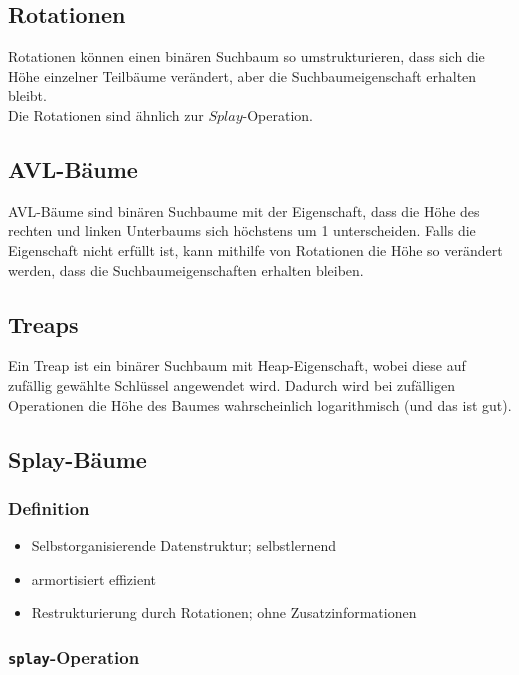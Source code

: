 \documentclass[11pt]{scrartcl}
\begin{document}
\subsection{Rotationen}
Rotationen können einen binären Suchbaum so umstrukturieren, dass sich die Höhe einzelner Teilbäume verändert, aber die Suchbaumeigenschaft erhalten bleibt. \\
Die Rotationen sind ähnlich zur $Splay$-Operation.

\subsection{AVL-Bäume}
AVL-Bäume sind binären Suchbaume mit der Eigenschaft, dass die Höhe des rechten und linken Unterbaums sich höchstens um 1 unterscheiden. Falls die Eigenschaft nicht erfüllt ist, kann mithilfe von Rotationen  die Höhe so verändert werden, dass die Suchbaumeigenschaften erhalten bleiben.

\subsection{Treaps}

Ein Treap ist ein binärer Suchbaum mit Heap-Eigenschaft, wobei diese auf zufällig gewählte Schlüssel angewendet wird. Dadurch wird bei zufälligen Operationen die Höhe des Baumes wahrscheinlich logarithmisch (und das ist gut).

\subsection{Splay-Bäume}

\subsubsection{Definition}
\begin{itemize}
	\item Selbstorganisierende Datenstruktur; selbstlernend
    \item armortisiert effizient
    \item Restrukturierung durch Rotationen; ohne Zusatzinformationen
\end{itemize}

\subsubsection{\texttt{splay}-Operation}
\end{document}
